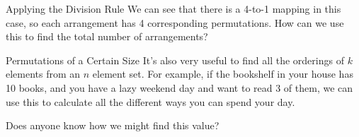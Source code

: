 \documentclass{beamer}
\begin{document}
\begin{frame}{Applying the Division Rule}
    We can see that there is a 4-to-1 mapping in this case, so each arrangement has 4 corresponding permutations. How can we use this to find the total number of arrangements?\vspace{5mm}
    
\end{frame}

\begin{frame}{Permutations of a Certain Size}
    It's also very useful to find all the orderings of $k$ elements from an $n$ element set. For example, if the bookshelf in your house has 10 books, and you have a lazy weekend day and want to read 3 of them, we can use this to calculate all the different ways you can spend your day. \vspace{2mm}
    
    Does anyone know how we might find this value? 
\end{frame}
\end{document}
